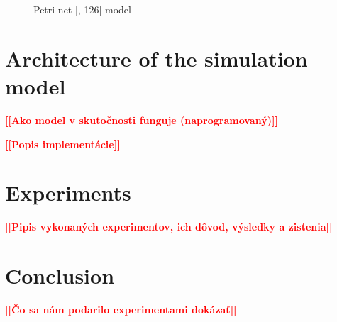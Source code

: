 \documentclass[a4paper, 11pt, a4paper]{article}
\newcommand{\todo}[1]{\textcolor{red}{\textbf{[[#1]]}}}
\begin{document}
\begin{figure}[ht]
    \begin{center}
    \end{center}
    \caption{Petri net [\cite{IMS.lectures}, 126] model}
    \label{figure:scheme}
\end{figure}


\section{Architecture of the simulation model}

\noindent\todo{Ako model v skutočnosti funguje (naprogramovaný)}

\noindent\todo{Popis implementácie}


\section{Experiments}

\todo{Pipis vykonaných experimentov, ich dôvod, výsledky a zistenia}


\section{Conclusion}

\todo{Čo sa nám podarilo experimentami dokázať}


\newpage


\renewcommand{\refname}{Sources}

\end{document}
